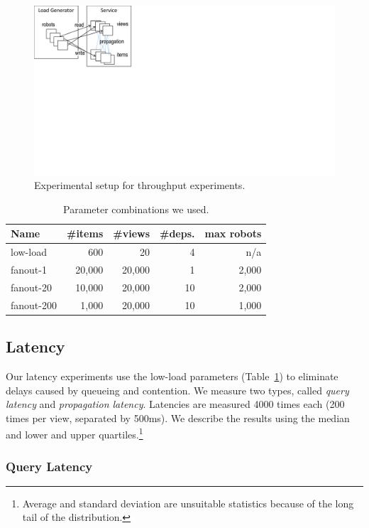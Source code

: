 \begin{figure}
\centering
\includegraphics[scale=.5, viewport=0 346 309 540]{figs/tp-setup} 
\caption{Experimental setup for throughput experiments.}\label{fig:tp-setup}
\end{figure}

\begin{table}
\begin{tabularx}{.99\columnwidth}{@{}Xrrrr@{}} \toprule
Name		& \#items 	& \#views & \#deps. & max robots\\ \midrule
low-load	&  600        	& 20       & 4 & n/a \\
fanout-1	& 20,000	& 20,000 & 1& 2,000 \\
fanout-20	& 10,000	& 20,000 & 10 & 2,000\\
fanout-200 & 1,000	& 20,000 & 10& 1,000\\  
\end{tabularx}
\caption{Parameter combinations we used.}\label{tab:param}
\end{table}


\subsection{Latency}\label{sec:latency}

Our latency experiments use the low-load parameters (Table~\ref{tab:param}) to eliminate delays caused by queueing and contention. We measure two types, called \emph{query latency} and \emph{propagation latency}. Latencies are measured 4000 times each (200 times per view, separated by 500ms). We describe the results using the median and lower and upper quartiles.\footnote{Average and standard deviation are unsuitable statistics because of the long tail of the distribution.}

\subsubsection{Query Latency}

